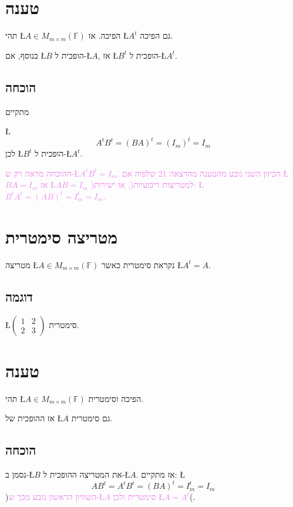 \documentclass[english,hebrew]{article}
\begin{document}
\section{טענה}

תהי \L{$A\in M_{m\times m}(\mathbb{F})$} הפיכה. אז \L{$A^{t}$} גם
הפיכה.

בנוסף, אם \L{$B$} הופכית ל-\L{$A$}, אז \L{$B^{t}$} הופכית ל-\L{$A^{t}$}.

\subsection{הוכחה}

מתקיים

\L{%
\[
A^{t}B^{t}=(BA)^{t}=(I_{m})^{t}=I_{m}
\]
}%
לכן \L{$B^{t}$} הופכית ל-\L{$A^{t}$}.

\textcolor{violet}{ההוכחה מראה רק ש-\L{$A^{t}B^{t}=I_{m}$}. הכיוון
השני נובע מהטענה מהרצאה 21 שלפיה אם \L{$BA=I_{m}$} אז \L{$AB=I_{m}$}
)למטריצות ריבועיות(, או ישירות: \L{$B^{t}A^{t}=(AB)^{t}=I_{m}^{t}=I_{m}$}.}

\section{מטריצה סימטרית}

מטריצה \L{$A\in M_{m\times m}(\mathbb{F})$} נקראת סימטרית כאשר \L{$A^{t}=A$}. 

\subsection{דוגמה}

\L{$\begin{pmatrix}1 & 2\\
2 & 3
\end{pmatrix}$} סימטרית.

\section{טענה}

תהי \L{$A\in M_{m\times m}(\mathbb{F})$} הפיכה וסימטרית.

אז ההופכית של \L{$A$} גם סימטרית.

\subsection{הוכחה}

נסמן ב-\L{$B$} את המטריצה ההופכית ל-\L{$A$}. אז מתקיים: \L{%
\[
AB^{t}=A^{t}B^{t}=(BA)^{t}=I_{m}^{t}=I_{m}
\]
}%
)\textcolor{violet}{השוויון הראשון נובע מכך ש-\L{$A$} סימטרית ולכן
\L{$A=A^{t}$}}(.
\end{document}
